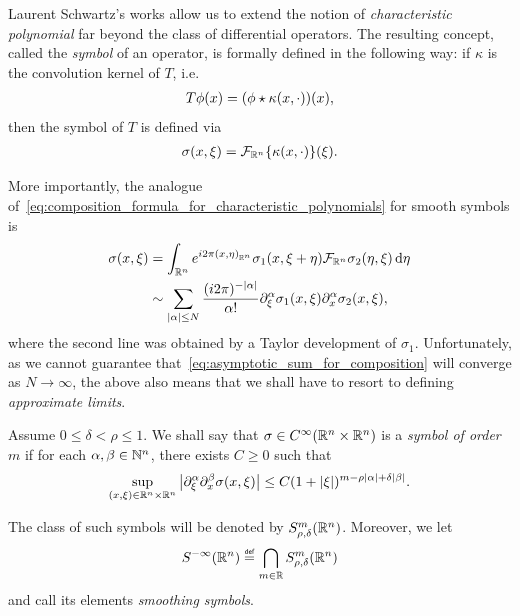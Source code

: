 Laurent Schwartz's works allow us to extend the notion of \emph{characteristic polynomial} far beyond the class of differential operators.
The resulting concept,
called the \emph{symbol} of an operator,
is formally defined in the following way:
if $\kappa$ is the convolution kernel of $T$, i.e.\
\begin{align*}
    T \phi(x) = (\conv \phi {\kappa(x, \dummy)})(x),
\end{align*}
then the symbol of $T$ is defined via
\begin{align*}
    \sigma(x, \xi) = \Fourier [\R^n] \{\kappa(x, \dummy)\}(\xi).
\end{align*}

More importantly,
the analogue of~\eqref{eq:composition_formula_for_characteristic_polynomials} for smooth symbols is
\begin{align}
    \sigma(x, \xi)
    &= \int_{\R^n} \e^{\i \turn \ip [\R^n] x \eta} \sigma_1(x, \xi + \eta) \Fourier [\R^n] \sigma_2(\eta, \xi) \dd \eta \notag\\
    &\sim \sum_{\abs \alpha \leq N} \frac {(\i \turn)^{-\abs \alpha}} {\alpha!} \iD{\xi^\alpha} \sigma_1(x, \xi) \iD{x^\alpha} \sigma_2(x, \xi),
    \label{eq:asymptotic_sum_for_composition}
\end{align}
where the second line was obtained by a Taylor development of $\sigma_1$.
Unfortunately,
as we cannot guarantee that~\eqref{eq:asymptotic_sum_for_composition} will converge as $N \to \infty$,
the above also means that we shall have to resort to defining \emph{approximate limits}.

\begin{definition}
    Assume $0 \leq \delta < \rho \leq 1$.
    We shall say that $\sigma \in \SmoothFunctions {\R^n \times \R^n}$ is a \emph{symbol of order $m$}
    if for each $\alpha, \beta \in \N^n$,
    there exists $C \geq 0$ such that
    \begin{align*}
        \sup_{(x, \xi) \in \R^n \times \R^n} \abs {\iD{\xi^\alpha} \iD{x^\beta}\sigma(x, \xi)} \leq C (1 + \abs \xi)^{m - \rho \abs \alpha + \delta \abs \beta}.
    \end{align*}

    The class of such symbols will be denoted by $\SymbolClass [\R^n] m {\rho, \delta}$.
    Moreover, we let
    \begin{align*}
        \SmoothingSymbols [\R^n] \defeq \bigcap_{m \in \R} \SymbolClass [\R^n] m {\rho, \delta}
    \end{align*}
    and call its elements \emph{smoothing symbols}.
\end{definition}

